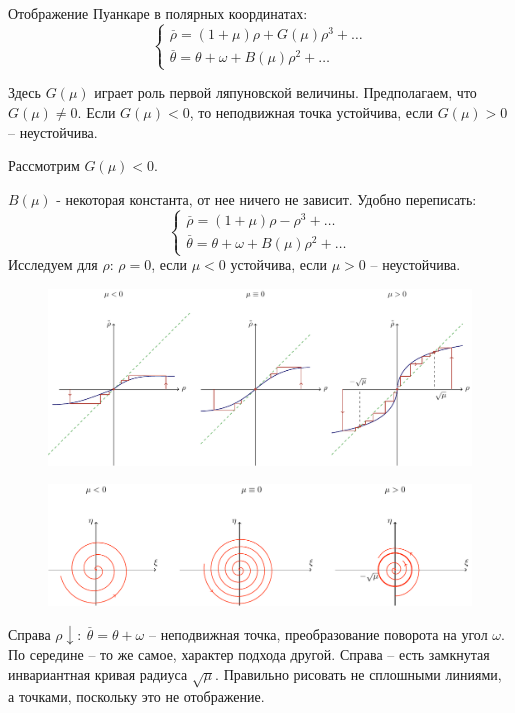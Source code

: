 Отображение Пуанкаре в полярных координатах:
\begin{equation}
	\left\{\begin{aligned}
		\stackrel{\_}{\rho}= (1+\mu)\rho+G(\mu)\rho^3+\dots \\
		\stackrel{\_}{\theta}= \theta+\omega+B(\mu)\rho^2+\dots
	\end{aligned}\right.
	\label{eq:s9:4}	
\end{equation}

Здесь $G(\mu)$ играет роль первой ляпуновской величины. Предполагаем, что $G(\mu)\neq 0$. Если $G(\mu)< 0$, то неподвижная точка устойчива, если $G(\mu)> 0$ -- неустойчива. 

Рассмотрим $G(\mu)< 0$. 

$B(\mu)$ - некоторая константа, от нее ничего не зависит. Удобно переписать:
\begin{equation}
	\left\{\begin{aligned}
		\stackrel{\_}{\rho}= (1+\mu)\rho-\rho^3+\dots \\
		\stackrel{\_}{\theta}= \theta+\omega+B(\mu)\rho^2+\dots
	\end{aligned}\right.
	\label{eq:s9:5}	
\end{equation}
Исследуем для $\rho$: $\rho=0$, если $\mu<0$ устойчива, если $\mu>0$ -- неустойчива.
\begin{figure}[H]
	\centering
	\includegraphics[width=1\linewidth]{fig/fig73.pdf}   
\end{figure}
\begin{figure}[H]
	\centering
	\includegraphics[width=1\linewidth]{fig/fig72.pdf}   
\end{figure}
Справа $\rho \downarrow: ~\stackrel{\_}{\theta}= \theta+\omega$ -- неподвижная точка, преобразование поворота на угол $\omega$. По середине -- то же самое, характер подхода другой. Справа -- есть замкнутая инвариантная кривая радиуса $\sqrt{\mu}$.
Правильно рисовать не сплошными линиями, а точками, поскольку это не отображение.

